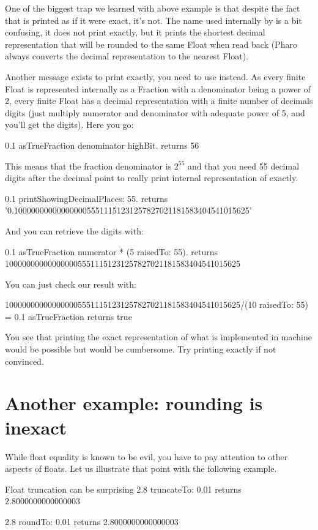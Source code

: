 \documentclass[a4paper,10pt,twoside]{book}
\begin{document}
One of the biggest trap we learned with above example is that despite the fact that  is printed  as if it were exact, it's not.
The name  used internally by  is a bit confusing, it does not print exactly,
but it prints the shortest decimal representation that will be rounded
to the same Float when read back (Pharo always converts the decimal representation to the nearest Float).

Another message exists to print exactly, you need to use  instead.
As every finite Float is  represented internally as a Fraction with a
denominator being a power of 2, every finite Float has a decimal
representation with a finite number of decimals digits (just multiply
numerator and denominator with adequate power of 5, and you'll get the
digits). Here you go:
\begin{code}{}
0.1 asTrueFraction denominator highBit.
	returns  56
\end{code}
This means that the fraction denominator is $2^{55}$ and that you need 55 decimal digits after the decimal point to really print internal representation of  exactly.
\begin{code}{}
0.1 printShowingDecimalPlaces: 55.
	returns '0.1000000000000000055511151231257827021181583404541015625'
\end{code}
And you can retrieve the digits with:
\begin{code}{}
0.1 asTrueFraction numerator * (5 raisedTo: 55).
	returns  1000000000000000055511151231257827021181583404541015625
\end{code}
You can just check our result with:
\begin{code}{}
1000000000000000055511151231257827021181583404541015625/(10 raisedTo: 55) =  0.1 asTrueFraction
	returns true
\end{code}
You see that printing the exact representation of what is implemented in machine would be possible but would be cumbersome. Try printing  exactly if not convinced.



\section{Another example: rounding is inexact}
While float equality is known to be evil, you have to pay attention to other aspects of floats. Let us illustrate that point with the following example.

\begin{code}{Float truncation can be surprising}
2.8 truncateTo: 0.01
	returns 2.8000000000000003

2.8 roundTo: 0.01
	returns 2.8000000000000003
\end{code}
\end{document}
